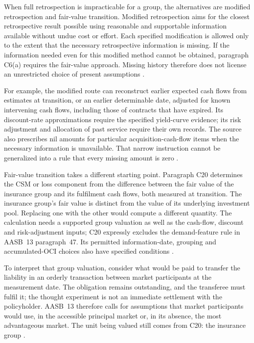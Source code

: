 When full retrospection is impracticable for a group, the alternatives are
modified retrospection and fair-value transition. Modified retrospection aims
for the closest retrospective result possible using reasonable and supportable
information available without undue cost or effort. Each specified modification
is allowed only to the extent that the necessary retrospective information is
missing. If the information needed even for this modified method cannot be
obtained, paragraph C6(a) requires the fair-value approach. Missing history
therefore does not license an unrestricted choice of present assumptions
\citep[paragraphs C5--C8]{aasb17}.

For example, the modified route can reconstruct earlier expected cash flows
from estimates at transition, or an earlier determinable date, adjusted for
known intervening cash flows, including those of contracts that have expired.
Its discount-rate approximations require the specified yield-curve evidence;
its risk adjustment and allocation of past service require their own records.
The source also prescribes nil amounts for particular acquisition-cash-flow
items when the necessary information is unavailable. That narrow instruction
cannot be generalized into a rule that every missing amount is zero
\citep[paragraphs C12--C16]{aasb17}.

Fair-value transition takes a different starting point. Paragraph C20 determines
the CSM or loss component from the difference between the fair value of the
insurance group and its fulfilment cash flows, both measured at transition.
The insurance group's fair value is distinct from the value of its underlying
investment pool. Replacing one with the other would compute a different
quantity. The calculation needs a supported group valuation as well as the
cash-flow, discount and risk-adjustment inputs; C20 expressly excludes the
demand-feature rule in AASB~13 paragraph~47. Its permitted information-date,
grouping and accumulated-OCI choices also have specified conditions
\citep[paragraphs C20--C24B]{aasb17}.

To interpret that group valuation, consider what would be paid to transfer
the liability in an orderly transaction between market participants at the
measurement date. The obligation remains outstanding, and the transferee must
fulfil it; the thought experiment is not an immediate settlement with the
policyholder. AASB~13 therefore calls for assumptions that market participants
would use, in the accessible principal market or, in its absence, the most
advantageous market. The unit being valued still comes from C20: the insurance
group \citep[paragraphs~2--3, 9, 13--24 and 34]{aasb13comp2021}.


